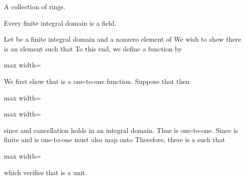 \documentclass[11pt,oneside]{article}
\begin{document}
\begin{BookBody}
A collection of rings.

 Every finite integral domain is a field.

 Let  be a finite integral domain and  a nonzero element of  We wish to show there is an element  such that  To this end, we define a function  by

\begin{center}\begin{adjustbox}{max width=\linewidth}\end{adjustbox}\end{center}

\noindent We first show that  is a one-to-one function. Suppose that  then

\begin{center}\begin{adjustbox}{max width=\linewidth}\end{adjustbox}\end{center}

\begin{center}\begin{adjustbox}{max width=\linewidth}\end{adjustbox}\end{center}

\noindent since  and cancellation holds in an integral domain. Thus  is one-to-one. Since  is finite and  is one-to-one must also map onto  Therefore, there is a  such that

\begin{center}\begin{adjustbox}{max width=\linewidth}\end{adjustbox}\end{center}

\noindent which verifies that  is a unit. \BookEnd{\blacklozenge}

\end{BookBody}

\BookNarrativetrue
\end{document}
